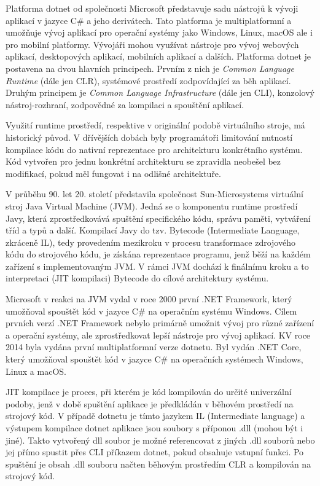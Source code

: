 

Platforma dotnet od společnosti Microsoft představuje sadu nástrojů k vývoji aplikací v jazyce C\# a jeho derivátech. Tato platforma je multiplatformní a umožňuje vývoj aplikací pro operační systémy jako Windows, Linux, macOS ale i pro mobilní platformy. Vývojáři mohou využívat nástroje pro vývoj webových aplikací, desktopových aplikací, mobilních aplikací a dalších. Platforma dotnet je postavena na dvou hlavních principech. Prvním z nich je \textit{Common Language Runtime} (dále jen CLR), systémové prostředí zodpovídající za běh aplikací. Druhým principem je \textit{Common Language Infrastructure} (dále jen CLI), konzolový nástroj-rozhraní, zodpovědné za kompilaci a spouštění aplikací. \cite{Richter2012}


Využití runtime prostředí, respektive v originální podobě virtuálního stroje, má historický původ. V dřívějších dobách byly programátoři limitování nutností kompilace kódu do nativní reprezentace pro architekturu konkrétního systému. Kód vytvořen pro jednu konkrétní architekturu se zpravidla neobešel bez modifikací, pokud měl fungovat i na odlišné architektuře.

V průběhu 90. let 20. století představila společnost Sun-Microsystems virtuální stroj Java Virtual Machine (JVM). Jedná se o komponentu runtime prostředí Javy, která zprostředkovává spuštění specifického kódu, správu paměti, vytváření tříd a typů a další. Kompilací Javy do tzv. Bytecode (Intermediate Language, zkráceně IL), tedy provedením mezikroku v procesu transformace zdrojového kódu do strojového kódu, je získána reprezentace programu, jenž běží na každém zařízení s implementovaným JVM. V rámci JVM dochází k finálnímu kroku a to interpretaci (JIT kompilaci) Bytecode do cílové architektury systému. 

Microsoft v reakci na JVM vydal v roce 2000 první .NET Framework, který umožňoval spouštět kód v jazyce C\# na operačním systému Windows. Cílem prvních verzí .NET Framework nebylo primárně umožnit vývoj pro různé zařízení a operační systémy, ale zprostředkovat lepší nástroje pro vývoj aplikací. KV roce 2014 byla vydána první multiplatformní verze dotnetu. Byl vydán .NET Core, který umožňoval spouštět kód v jazyce C\# na operačních systémech Windows, Linux a macOS. \cite{Richter2012}

JIT kompilace je proces, při kterém je kód kompilován do určité univerzální podoby, jenž v době spuštění aplikace je předkládán v běhovém prostředí na strojový kód. V případě dotnetu je tímto jazykem IL (Intermediate language) a výstupem kompilace dotnet aplikace jsou soubory s příponou .dll (mohou být i jiné). Takto vytvořený dll soubor je možné referencovat z jiných .dll souborů nebo jej přímo spustit přes CLI příkazem dotnet, pokud obsahuje vstupní funkci. Po spuštění je obsah .dll souboru načten běhovým prostředím CLR a kompilován na strojový kód.

